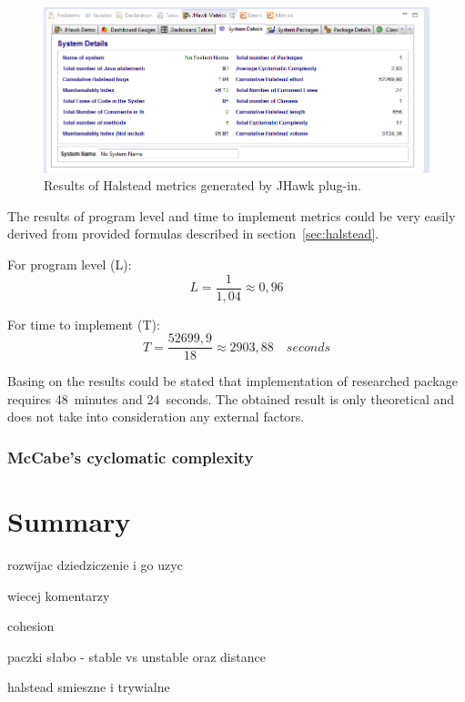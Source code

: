 \begin{figure}[h!]
	\centering
	\includegraphics[scale=0.7]{img/jhawk3.png}  
	\caption{Results of Halstead metrics generated by JHawk plug-in.}		
	\label{fig:jhawk3}
\end{figure}

The results of program level and time to implement metrics could be very easily derived from provided formulas described in section~\ref{sec:halstead}. 

For program level (L):
\[L=\frac { 1 }{ 1,04 } \approx 0,96\]

For time to implement (T):
\[T=\frac { 52699,9 }{ 18 } \approx 2903,88\quad seconds\]

Basing on the results could be stated that implementation of researched package requires 48~minutes and 24~seconds. The obtained result is only theoretical and does not take into consideration any external factors.  

\subsubsection*{McCabe's cyclomatic complexity}


\section{Summary}
rozwijac dziedziczenie i go uzyc

wiecej komentarzy

cohesion

paczki słabo - stable vs unstable   oraz distance

halstead smieszne i trywialne